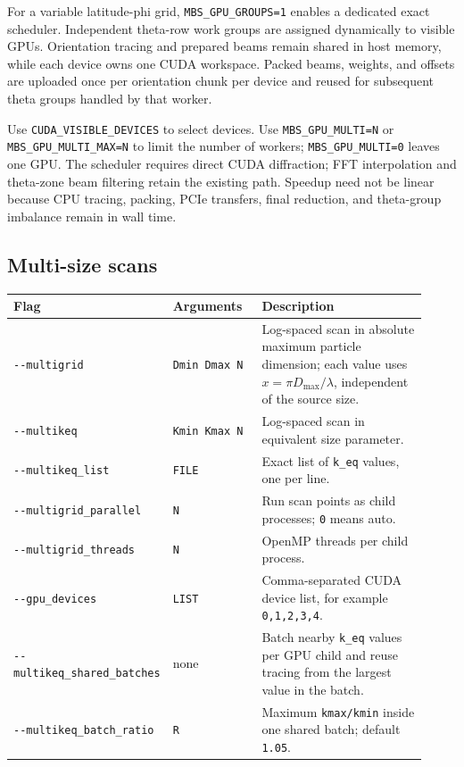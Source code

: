 \documentclass[
  10pt,
  a4paper,
]{article}
\begin{document}
For a variable latitude-phi grid, \texttt{MBS\_GPU\_GROUPS=1} enables a
dedicated exact scheduler. Independent theta-row work groups are assigned
dynamically to visible GPUs. Orientation tracing and prepared beams remain
shared in host memory, while each device owns one CUDA workspace. Packed
beams, weights, and offsets are uploaded once per orientation chunk per
device and reused for subsequent theta groups handled by that worker.

Use \nolinkurl{CUDA_VISIBLE_DEVICES} to select devices. Use
\nolinkurl{MBS_GPU_MULTI=N} or \nolinkurl{MBS_GPU_MULTI_MAX=N} to limit the
number of workers; \nolinkurl{MBS_GPU_MULTI=0} leaves one GPU. The scheduler
requires direct CUDA diffraction; FFT interpolation and theta-zone beam
filtering retain the existing path. Speedup need not be linear because CPU
tracing, packing, PCIe transfers, final reduction, and theta-group imbalance
remain in wall time.

\subsection{Multi-size scans}\label{multi-size-scans}

\begin{longtable}[]{@{}L{0.24\linewidth}L{0.22\linewidth}L{0.46\linewidth}@{}}
\toprule\noalign{}
Flag & Arguments & Description \\
\midrule\noalign{}
\endhead
\bottomrule\noalign{}
\endlastfoot
\texttt{-\/-multigrid} & \texttt{Dmin\ Dmax\ N} & Log-spaced scan in
absolute maximum particle dimension; each value uses
\(x=\pi D_{\max}/\lambda\), independent of the source size. \\
\texttt{-\/-multikeq} & \texttt{Kmin\ Kmax\ N} & Log-spaced scan in
equivalent size parameter. \\
\texttt{-\/-multikeq\_list} & \texttt{FILE} & Exact list of
\texttt{k\_eq} values, one per line. \\
\texttt{-\/-multigrid\_parallel} & \texttt{N} & Run scan points as child
processes; \texttt{0} means auto. \\
\texttt{-\/-multigrid\_threads} & \texttt{N} & OpenMP threads per child
process. \\
\texttt{-\/-gpu\_devices} & \texttt{LIST} & Comma-separated CUDA device
list, for example \texttt{0,1,2,3,4}. \\
\nolinkurl{--multikeq_shared_batches} & none & Batch nearby
\texttt{k\_eq} values per GPU child and reuse tracing from the largest
value in the batch. \\
\texttt{-\/-multikeq\_batch\_ratio} & \texttt{R} & Maximum
\texttt{kmax/kmin} inside one shared batch; default \texttt{1.05}. \\
\end{longtable}
\end{document}
